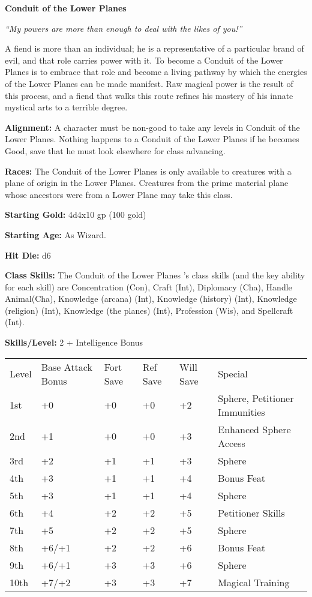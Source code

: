 \documentclass[10pt]{article}
\newcommand{\ability}[2]{\smallskip \textbf{#1} #2}
\newcommand{\classname}[1]{{\huge \textbf{#1}}}
\newcommand{\quot}[1]{\emph{#1}\bigskip}
\newcommand{\desc}[1]{#1 \medskip}
\begin{document}
\classname{Conduit of the Lower Planes}

\quot{``My powers are more than enough to deal with the likes of you!''}

\desc{A fiend is more than an individual; he is a representative of a particular brand of evil, and that role carries power with it. To become a Conduit of the Lower Planes is to embrace that role and become a living pathway by which the energies of the Lower Planes can be made manifest. Raw magical power is the result of this process, and a fiend that walks this route refines his mastery of his innate mystical arts to a terrible degree.}

\ability{Alignment:}{ A character must be non-good to take any levels in Conduit of the Lower Planes. Nothing happens to a Conduit of the Lower Planes if he becomes Good, save that he must look elsewhere for class advancing.}

\ability{Races:}{ The Conduit of the Lower Planes is only available to creatures with a plane of origin in the Lower Planes. Creatures from the prime material plane whose ancestors were from a Lower Plane may take this class.}

\ability{Starting Gold:}{ 4d4x10 gp (100 gold)}

\ability{Starting Age:}{ As Wizard.}

\ability{Hit Die:}{ d6}

\ability{Class Skills:}{ The Conduit of the Lower Planes 's class skills (and the key ability for each skill) are Concentration (Con), Craft (Int), Diplomacy (Cha), Handle Animal(Cha), Knowledge (arcana) (Int), Knowledge (history) (Int), Knowledge (religion) (Int), Knowledge (the planes) (Int), Profession (Wis), and Spellcraft (Int).}

\ability{Skills/Level:}{ 2 + Intelligence Bonus}

\begin{table}[tbh]
\begin{small}
\begin{tabular}{lp{2cm}p{1cm}p{1cm}p{1cm}l}
Level  &Base Attack Bonus &Fort  Save &Ref Save &Will Save &Special\\
1st &+0 &+0 &+0 &+2 &Sphere, Petitioner Immunities\\
2nd &+1 &+0 &+0 &+3 &Enhanced Sphere Access\\
3rd &+2 &+1 &+1 &+3 &Sphere\\
4th &+3 &+1 &+1 &+4 &Bonus Feat\\
5th &+3 &+1 &+1 &+4 &Sphere\\
6th &+4 &+2 &+2 &+5 &Petitioner Skills\\
7th &+5 &+2 &+2 &+5 &Sphere\\
8th &+6/+1 &+2 &+2 &+6 &Bonus Feat\\
9th &+6/+1 &+3 &+3 &+6 &Sphere\\
10th &+7/+2 &+3 &+3 &+7 &Magical Training\\
\end{tabular}
\end{small}
\end{table}
\end{document}
